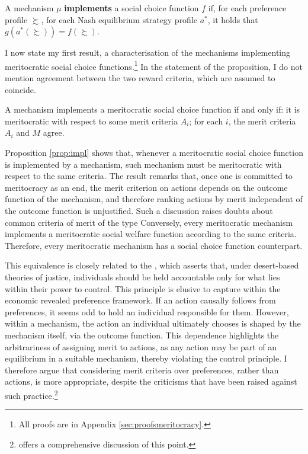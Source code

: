 \begin{definition}
	A mechanism \( \mu \) \textbf{implements} a social choice function \( f \) if, for each preference profile \( \succsim \), for each Nash equilibrium strategy profile \( a^{*} \), it holds that \( g( a^{*} ( \succsim ) ) = f ( \succsim ) \).
\end{definition}

I now state my first result, a characterisation of the mechanisms implementing meritocratic social choice functions.\footnote{All proofs are in Appendix \ref{sec:proofsmeritocracy}.} In the statement of the proposition, I do not mention agreement between the two reward criteria, which are assumed to coincide.

\begin{prop}\label{prop:impl}
	A mechanism implements a meritocratic social choice function if and only if: it is meritocratic with respect to some merit criteria \( A_i \); for each \( i \), the merit criteria \( A_i \) and \( M \) agree.
\end{prop}

Proposition \ref{prop:impl} shows that, whenever a meritocratic social choice function is implemented by a mechanism, such mechanism must be meritocratic with respect to the same criteria. The result remarks that, once one is committed to meritocracy as an end, the merit criterion on actions depends on the outcome function of the mechanism, and therefore ranking actions by merit independent of the outcome function is unjustified. Such a discussion raises doubts about common criteria of merit of the type  Conversely, every meritocratic mechanism implements a meritocratic social welfare function according to the same criteria. Therefore, every meritocratic mechanism has a social choice function counterpart.

This equivalence is closely related to the  \citep{arnesonDesertEquality2007,fleurbaey2008fairness}, which asserts that, under desert-based theories of justice, individuals should be held accountable only for what lies within their power to control. This principle is elusive to capture within the economic revealed preference framework. If an action causally follows from preferences, it seems odd to hold an individual responsible for them. However, within a mechanism, the action an individual ultimately chooses is shaped by the mechanism itself, via the outcome function. This dependence highlights the arbitrariness of assigning merit to actions, as any action may be part of an equilibrium in a suitable mechanism, thereby violating the control principle. I therefore argue that considering merit criteria over preferences, rather than actions, is more appropriate, despite the criticisms that have been raised against such practice.\footnote{\citet[ch. 10]{fleurbaey2008fairness} offers a comprehensive discussion of this point.}

